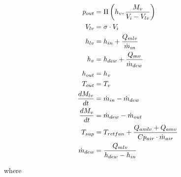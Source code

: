 \begin{align}
	p_{out}            & = \Pi \left( h_v, \frac{M_v}{V_i-V_{lv}} \right)		\label{eq:evap_pout}                       \\
	V_{lv}             & = \sigma \cdot V_i                                                                           \\
	h_{lv}             & = h_{in} + \frac{Q_{mlv}}{\dot{m}_{in}}                                                      \\
	h_v                & = h_{dew} + \frac{Q_{mv}}{\dot{m}_{dew}}               \label{eq:evap_hv}                                       \\
	h_{out}            & = h_v                                                                                       \\
	T_{out}            & = T_v                                                                                        \\
	\frac{dM_{lv}}{dt} & = \dot{m}_{in} - \dot{m}_{dew}                                                               \\
	\frac{dM_v}{dt}    & = \dot{m}_{dew} - \dot{m}_{out}                   \label{eq:evap_dMvdt}                      \\
	T_{sup}            & = T_{retfan} +  \frac{Q_{amlv} + Q_{amv}}{Cp_{air} \cdot \dot{m}_{air}} \label{eq:evap_Tsup} \\
	\dot{m}_{dew}      & = \frac{Q_{mlv}}{h_{dew} - h_{in}} \label{eq:evap_mdot_{lv}}
\end{align}



where\\


